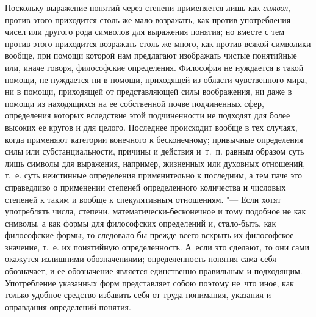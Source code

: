 Поскольку выражение понятий через степени применяется лишь как {\em символ},
против этого приходится столь же мало возражать, как против употребления чисел
или другого рода символов для выражения понятия; но вместе с тем против этого
приходится возражать столь же много, как против всякой символики вообще, при
помощи которой нам предлагают изображать чистые понятийные или, иначе говоря,
философские определения. Философия не нуждается в такой помощи, не нуждается ни
в помощи, приходящей из области чувственного мира, ни в помощи, приходящей от
представляющей силы воображения, ни даже в помощи из находящихся на ее
собственной почве подчиненных сфер, определения которых вследствие этой
подчиненности не подходят для более высоких ее кругов и для целого. Последнее
происходит вообще в тех случаях, когда применяют категории конечного к
бесконечному; привычные определения силы или субстанциальности, причины и
действия и~т.~п. равным образом суть лишь символы для выражения, например,
жизненных или духовных отношений, т.~е. суть неистинные определения
применительно к последним, а тем паче это справедливо о применении степеней
определенного количества и числовых степеней к таким и вообще к спекулятивным
отношениям. "--- Если хотят употреблять числа, степени,
математически-бесконечное и тому подобное не как символы, а как формы для
философских определений и, стало-быть, как философские формы, то следовало бы
прежде всего вскрыть их философское значение, т.~е. их понятийную
определенность. А~если это сделают, то они сами окажутся излишними
обозначениями; определенность понятия сама себя обозначает, и ее обозначение
является единственно правильным и подходящим. Употребление указанных форм
представляет собою поэтому не~что иное, как только удобное средство избавить
себя от труда понимания, указания и оправдания определений понятия.

\bigskip
